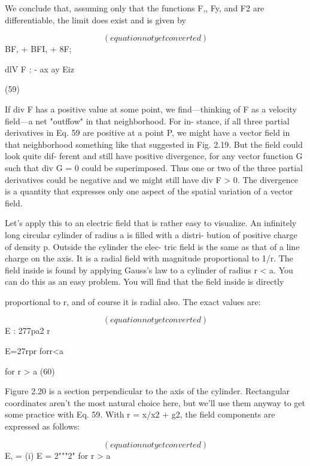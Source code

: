 We conclude that, assuming only that the functions F,, Fy, and F2
are differentiable, the limit does exist and is given by

\begin{equation}
(equation not yet converted)
\end{equation}
BF, + BFI, + 8F;

dlV F : -
ax ay Eiz

(59)

If div F has a positive value at some point, we find---thinking of F
as a velocity field---a net "outffow" in that neighborhood. For in-
stance, if all three partial derivatives in Eq. 59 are positive at a
point P, we might have a vector field in that neighborhood something
like that suggested in Fig. 2.19. But the field could look quite dif-
ferent and still have positive divergence, for any vector function G
such that div G = 0 could be superimposed. Thus one or two of the
three partial derivatives could be negative and we might still have
div F > 0. The divergence is a quantity that expresses only one
aspect of the spatial variation of a vector field.

Let's apply this to an electric field that is rather easy to visualize.
An infinitely long circular cylinder of radius a is filled with a distri-
bution of positive charge of density p. Outside the cylinder the elec-
tric field is the same as that of a line charge on the axis. It is a radial
field with magnitude proportional to 1/r. The field inside is found
by applying Gauss's law to a cylinder of radius r < a. You can do
this as an easy problem. You will find that the field inside is directly

proportional to r, and of course it is radial also. The exact values
are:

\begin{equation}
(equation not yet converted)
\end{equation}
E : 277pa2
r

E=27rpr forr<a

for r > a
(60)

Figure 2.20 is a section perpendicular to the axis of the cylinder.
Rectangular coordinates aren't the most natural choice here, but
we'll use them anyway to get some practice with Eq. 59. With
r = x/x2 + g2, the field components are expressed as follows:

\begin{equation}
(equation not yet converted)
\end{equation}
E, = (i) E = 2"""2" for r > a

